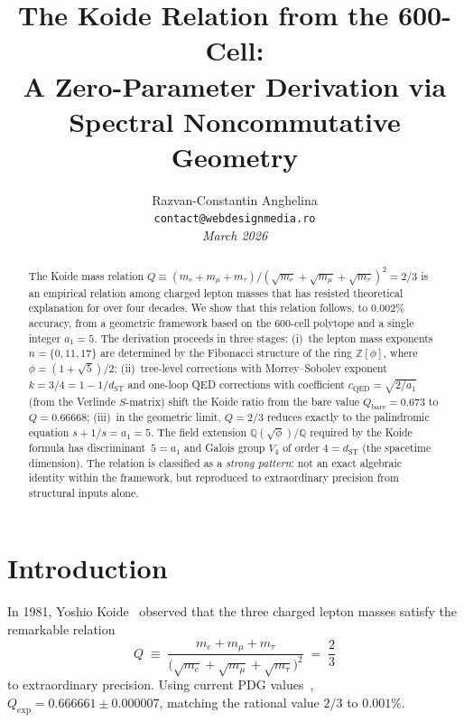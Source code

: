\documentclass[12pt,a4paper]{article}
\title{\textbf{The Koide Relation from the 600-Cell:\\
A Zero-Parameter Derivation via Spectral Noncommutative Geometry}}
\author{
Razvan-Constantin Anghelina\\
\texttt{contact@webdesignmedia.ro}\\[1em]
\textit{March 2026}
}
\date{}
\theoremstyle{definition}
\begin{document}
\maketitle

\begin{abstract}
The Koide mass relation $Q \equiv (m_e + m_\mu + m_\tau)/(\sqrt{m_e} + \sqrt{m_\mu} + \sqrt{m_\tau})^2 = 2/3$ is an empirical relation among charged lepton masses that has resisted theoretical explanation for over four decades.  We show that this relation follows, to $0.002\%$ accuracy, from a geometric framework based on the 600-cell polytope and a single integer $a_1 = 5$.  The derivation proceeds in three stages: (i)~the lepton mass exponents $n = \{0, 11, 17\}$ are determined by the Fibonacci structure of the ring $\mathbb{Z}[\phi]$, where $\phi = (1+\sqrt{5})/2$; (ii)~tree-level corrections with Morrey--Sobolev exponent $k = 3/4 = 1 - 1/d_{\mathrm{ST}}$ and one-loop QED corrections with coefficient $c_{\mathrm{QED}} = \sqrt{2/a_1}$ (from the Verlinde $S$-matrix) shift the Koide ratio from the bare value $Q_{\mathrm{bare}} = 0.673$ to $Q = 0.66668$; (iii)~in the geometric limit, $Q = 2/3$ reduces exactly to the palindromic equation $s + 1/s = a_1 = 5$.  The field extension $\mathbb{Q}(\sqrt{\phi})/\mathbb{Q}$ required by the Koide formula has discriminant~$5 = a_1$ and Galois group $V_4$ of order $4 = d_{\mathrm{ST}}$ (the spacetime dimension).  The relation is classified as a \emph{strong pattern}: not an exact algebraic identity within the framework, but reproduced to extraordinary precision from structural inputs alone.
\end{abstract}

\tableofcontents
\newpage

\section{Introduction}
\label{sec:intro}

In 1981, Yoshio Koide~\cite{Koide1983} observed that the three charged lepton masses satisfy the remarkable relation
\begin{equation}
Q \;\equiv\; \frac{m_e + m_\mu + m_\tau}{\bigl(\sqrt{m_e} + \sqrt{m_\mu} + \sqrt{m_\tau}\bigr)^2} \;=\; \frac{2}{3}
\label{eq:koide_def}
\end{equation}
to extraordinary precision.  Using current PDG values~\cite{PDG2024}, $Q_{\mathrm{exp}} = 0.666661 \pm 0.000007$, matching the rational value $2/3$ to $0.001\%$.
\end{document}
